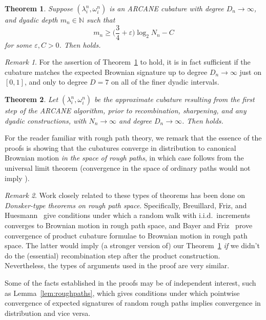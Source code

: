 \documentclass[11pt, letterpaper]{article}
\newtheorem{theorem}{Theorem}
\theoremstyle{definition}
\theoremstyle{remark}
\newtheorem{remark}{Remark}
\newcommand{\N}{\mathbb{N}}
\newcommand{\short}{ARCANE\xspace}
\begin{document}
\begin{theorem}\label{thm:maindyadic}
    Suppose $(\lambda_i^n, \omega_i^n)$ is an \short cubature with degree $D_n \to \infty$, and dyadic depth $m_n \in \N$ such that \[
    m_n \ge \Big(\frac 34 + \varepsilon\Big) \log_2 N_n - C
    \] for some $\varepsilon, C > 0$.
    Then  holds.
\end{theorem}
\begin{remark}
    For the assertion of Theorem~\ref{thm:maindyadic} to hold, it is in fact sufficient if the cubature matches the expected Brownian signature up to degree $D_n \to \infty$ just on $[0,1]$, and only to degree $D=7$ on all of the finer dyadic intervals.
\end{remark}
\begin{theorem}\label{thm:mainOA}
    Let $(\lambda_i^n,\omega_i^n)$ be the approximate cubature resulting from the first step of the \short algorithm, prior to recombination, sharpening, and any dyadic constructions, with $N_n \to \infty$ and degree $D_n \to \infty$. Then  holds.
\end{theorem}


For the reader familiar with rough path theory, we remark that the essence of the proofs is showing that the cubatures converge in distribution to canonical Brownian motion \emph{in the space of rough paths}, in which case  follows from the universal limit theorem \cite[Section 3.5]{terrystflour} (convergence in the space of ordinary paths would not imply ).

\medskip
\begin{remark}
    Work closely related to these types of theorems has been done on \emph{Donsker-type theorems on rough path space}. Specifically, Breuillard, Friz, and Huesmann~\cite{donskerRW} give conditions under which a random walk with i.i.d.\ increments converges to Brownian motion in rough path space, and Bayer and Friz~\cite{donskercubature} prove convergence of product cubature formulae to Brownian motion in rough path space. The latter would imply (a stronger version of) our Theorem~\ref{thm:maindyadic} \emph{if} we didn't do the (essential) recombination step after the product construction. Nevertheless, the types of arguments used in the proof are very similar.
\end{remark}

Some of the facts established in the proofs may be of independent interest, such as Lemma~\ref{lem:roughpaths}, which gives conditions under which pointwise convergence of expected signatures of random rough paths implies convergence in distribution and vice versa.
\end{document}
